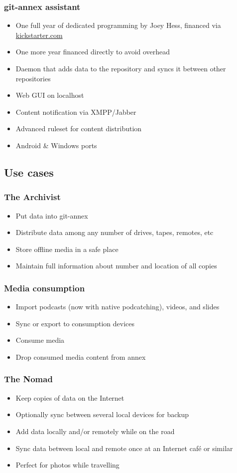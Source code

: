 \documentclass[t]{beamer}
\begin{document}
\begin{frame}
	\frametitle{git-annex assistant}
	\begin{itemize}
		\item One full year of dedicated programming by Joey Hess, financed via \url{kickstarter.com}
		\item One more year financed directly to avoid overhead
		\item Daemon that adds data to the repository and syncs it between other repositories
		\item Web GUI on localhost
		\item Content notification via XMPP/Jabber
		\item Advanced ruleset for content distribution
		\item Android \& Windows ports
	\end{itemize}
\end{frame}


\subsection{Use cases}

\begin{frame}
	\frametitle{The Archivist}
	\begin{itemize}
		\item Put data into git-annex
		\item Distribute data among any number of drives, tapes, remotes, etc
		\item Store offline media in a safe place
		\item Maintain full information about number and location of all copies
	\end{itemize}
\end{frame}

\begin{frame}
	\frametitle{Media consumption}
	\begin{itemize}
		\item Import podcasts (now with native podcatching), videos, and slides
		\item Sync or export to consumption devices
		\item Consume media
		\item Drop consumed media content from annex
	\end{itemize}
\end{frame}

\begin{frame}
	\frametitle{The Nomad}
	\begin{itemize}
		\item Keep copies of data on the Internet
		\item Optionally sync between several local devices for backup
		\item Add data locally and/or remotely while on the road
		\item Sync data between local and remote once at an Internet café or similar
		\item Perfect for photos while travelling
	\end{itemize}
\end{frame}
\end{document}
